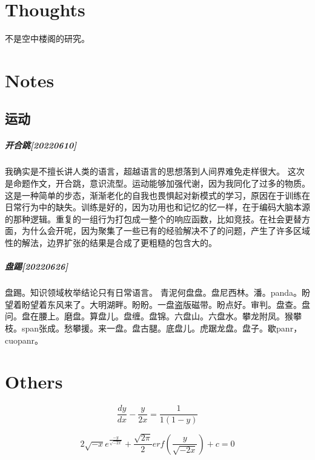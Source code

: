 \documentclass[UTF8]{book}
\begin{document}
\chapter{Thoughts}
    不是空中楼阁的研究。


    

\chapter{Notes}

\section{运动}

\paragraph{开合跳[20220610]}

我确实是不擅长讲人类的语言，超越语言的思想落到人间界难免走样很大。
这次是命题作文，开合跳，意识流型。运动能够加强代谢，因为我同化了过多的物质。这是一种简单的步态，渐渐老化的自我也畏惧起对新模式的学习，原因在于训练在日常行为中的缺失。训练是好的，因为功用也和记忆的忆一样，在于编码大脑本源的那种逻辑。重复的一组行为打包成一整个的响应函数，比如竞技。在社会更替方面，为什么会开呢，因为聚集了一些已有的经验解决不了的问题，产生了许多区域性的解法，边界扩张的结果是合成了更粗糙的包含大的。

\paragraph{盘踢[20220626]}

盘踢。知识领域枚举结论只有日常语言。
青泥何盘盘。盘尼西林。潘。panda。盼望着盼望着东风来了。大明湖畔。盼盼。一盘盗版磁带。盼点好。审判。盘查。盘问。盘在腰上。磨盘。算盘儿。盘缠。盘锦。六盘山。六盘水。攀龙附凤。猴攀枝。span张成。愁攀援。来一盘。盘古腿。底盘儿。虎踞龙盘。盘子。歇panr，cuopanr。

\chapter{Others}


    
\begin{equation}
    \frac{dy}{dx}-\frac{y}{2x}=\frac{1}{1(1-y)}
\end{equation}
     
\begin{equation}
    2\sqrt{-x}e^{\frac{-y}{\sqrt{-2x}}}+
    \frac{\sqrt{2\pi}}{2}erf \left( \frac{y}{\sqrt{-2x}} \right)+c=0
\end{equation}
\end{document}
